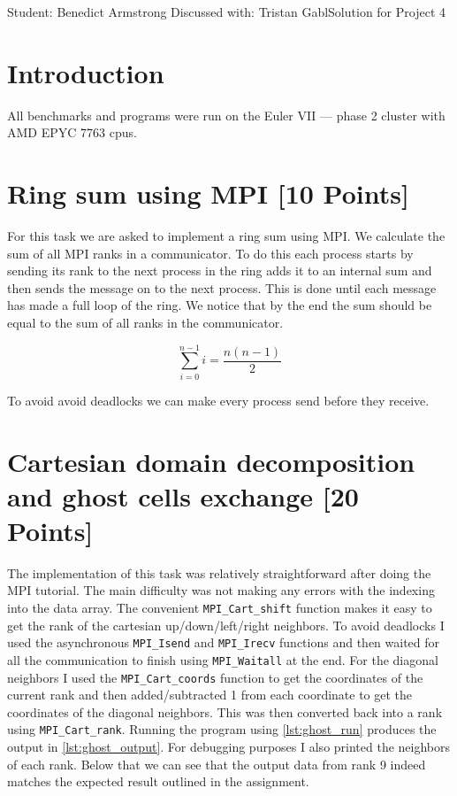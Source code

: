 \documentclass[unicode,11pt,a4paper,oneside,numbers=endperiod,openany]{scrartcl}
\begin{document}
\setassignment
{}

{Student: Benedict Armstrong}
{Discussed with: Tristan Gabl}{Solution for Project 4}{}
\newline


\section{Introduction}

All benchmarks and programs were run on the Euler VII — phase 2 cluster with AMD EPYC 7763 cpus.

\section{Ring sum using MPI [10 Points]}
For this task we are asked to implement a ring sum using MPI. We calculate the sum of all MPI ranks in a communicator. To do this each process starts by sending its rank to the next process in the ring adds it to an internal sum and then sends the message on to the next process. This is done until each message has made a full loop of the ring. We notice that by the end the sum should be equal to the sum of all ranks in the communicator.

$$
      \sum_{i=0}^{n-1} i = \frac{n(n-1)}{2}
$$


To avoid avoid deadlocks we can make every process send before they receive.


\section{Cartesian domain decomposition and ghost cells exchange [20 Points]}

The implementation of this task was relatively straightforward after doing the MPI tutorial. The main difficulty was not making any errors with the indexing into the data array. The convenient \texttt{MPI\_Cart\_shift} function makes it easy to get the rank of the cartesian up/down/left/right neighbors. To avoid deadlocks I used the asynchronous \texttt{MPI\_Isend} and \texttt{MPI\_Irecv} functions and then waited for all the communication to finish using \texttt{MPI\_Waitall} at the end.
For the diagonal neighbors I used the \texttt{MPI\_Cart\_coords} function to get the coordinates of the current rank and then added/subtracted 1 from each coordinate to get the coordinates of the diagonal neighbors. This was then converted back into a rank using \texttt{MPI\_Cart\_rank}. Running the program using \ref{lst:ghost_run} produces the output in \ref{lst:ghost_output}. For debugging purposes I also printed the neighbors of each rank. Below that we can see that the output data from rank 9 indeed matches the expected result outlined in the assignment.
\end{document}
